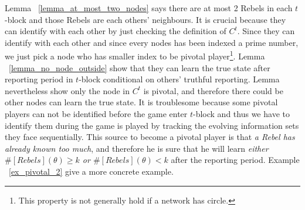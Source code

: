 \documentclass[12pt,letter]{article}
\theoremstyle{definition}
\theoremstyle{remark}
\theoremstyle{claim}
\begin{document}
Lemma ~\ref{lemma_at_most_two_nodes} says there are at most 2 Rebels in each $t$-block and those Rebels are each others' neighbours. It is crucial because they can identify with each other by just checking the definition of $C^t$. Since they can identify with each other and since every nodes has been indexed a prime number, we just pick a node who has smaller index to be pivotal player\footnote{This property is not generally hold if a network has circle.}. Lemma ~\ref{lemma_no_node_outside} show that they can learn the true state after reporting period in $t$-block conditional on others' truthful reporting. Lemma nevertheless show only the node in $C^t$ is pivotal, and therefore there could be other nodes can learn the true state. It is troublesome because some pivotal players can not be identified before the game enter $t$-block and thus we have to identify them during the game is played by tracking the evolving information sets they face sequentially. This source to become a pivotal player is that \textit{a Rebel has already known too much}, and therefore he is sure that he will learn \textit{either $\#[Rebels](\theta)\geq k$ or $\#[Rebels](\theta)< k$} after the reporting period. Example ~\ref{ex_pivotal_2} give a more concrete example.
\end{document}
